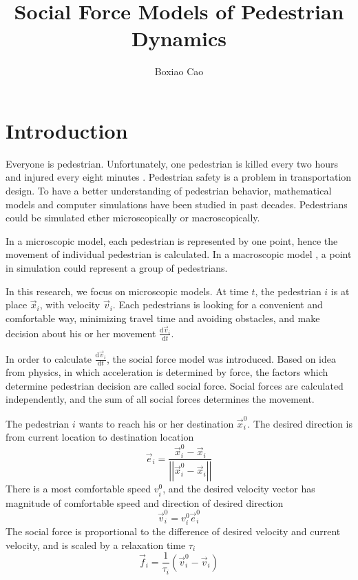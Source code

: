 \documentclass{article}
\newcommand{\lb}{\left(}
\newcommand{\rb}{\right)}
\newcommand{\db}[1]{{\lb {#1} \rb}}
\newcommand{\abs}[1]{\left| {#1} \right|}
\newcommand{\ddfrac}[2]{\frac{{\mathrm d}{#1}}{{\mathrm d}{#2}}}
\begin{document}
	\title{Social Force Models of Pedestrian Dynamics}
	\author{Boxiao Cao}
	\maketitle
	\section{Introduction}
        Everyone is pedestrian. Unfortunately, one pedestrian is killed every two hours and injured every eight minutes \cite{national2013traffic}.
        Pedestrian safety is a problem in transportation design.
        To have a better understanding of pedestrian behavior, mathematical models and computer simulations have been studied in past decades.
        Pedestrians could be simulated ether microscopically or macroscopically.
        
        In a microscopic model, each pedestrian is represented by one point, hence the movement of individual pedestrian is calculated.
        In a macroscopic model \cite{helbing1998fluid}, a point in simulation could represent a group of pedestrians.

        In this research, we focus on microscopic models.
        At time $t$, the pedestrian $i$ is at place $\vec{x}_i$, with velocity $\vec{v}_i$.
        Each pedestrians is looking for a convenient and comfortable way, minimizing travel time and avoiding obstacles, and make decision about his or her movement $\ddfrac{\vec{v}_i}{t}$.

        In order to calculate $\ddfrac{\vec{v}_i}{t}$, the social force model \cite{helbing1991mathematical,helbing1995social} was introduced.
        Based on idea from physics, in which acceleration is determined by force, the factors which determine pedestrian decision are called social force.
        Social forces are calculated independently, and the sum of all social forces determines the movement.

        The pedestrian $i$ wants to reach his or her destination $\vec{x}_i^0$.
        The desired direction is from current location to destination location
        $$
            \vec{e}_i = \frac{\vec{x}^0_i-\vec{x}_i}{\abs{\abs{\vec{x}^0_i-\vec{x}_i}}}
        $$
        There is a most comfortable speed $v_i^0$, and the desired velocity vector has magnitude of comfortable speed and direction of desired direction
        $$
            \vec{v}_i^0 = v_i^0\vec{e}_i^0
        $$
        The social force is proportional to the difference of desired velocity and current velocity, and is scaled by a relaxation time $\tau_i$
        $$
            \vec{f}_i =\frac{1}{\tau_i}\db{\vec{v}_i^0-\vec{v}_i}
        $$
\end{document}
